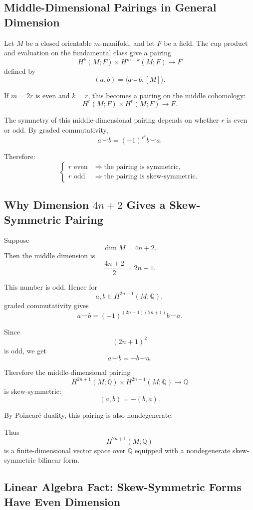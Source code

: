 \documentclass[12pt,a4paper]{article}
\theoremstyle{notespace}
\begin{document}
\subsection{Middle-Dimensional Pairings in General Dimension}

Let \(M\) be a closed orientable \(m\)-manifold, and let \(F\) be a field. The cup
product and evaluation on the fundamental class give a pairing
\[
H^k(M;F)\times H^{m-k}(M;F)\longrightarrow F
\]
defined by
\[
(a,b)=\langle a\smile b,[M]\rangle.
\]

If \(m=2r\) is even and \(k=r\), this becomes a pairing on the middle cohomology:
\[
H^r(M;F)\times H^r(M;F)\longrightarrow F.
\]

The symmetry of this middle-dimensional pairing depends on whether \(r\) is even
or odd. By graded commutativity,
\[
a\smile b=(-1)^{r^2}b\smile a.
\]

Therefore:
\[
\begin{cases}
	r \text{ even} & \Longrightarrow \text{the pairing is symmetric},\\
	r \text{ odd} & \Longrightarrow \text{the pairing is skew-symmetric}.
\end{cases}
\]

\subsection{Why Dimension \(4n+2\) Gives a Skew-Symmetric Pairing}

Suppose
\[
\dim M=4n+2.
\]
Then the middle dimension is
\[
\frac{4n+2}{2}=2n+1.
\]

This number is odd. Hence for
\[
a,b\in H^{2n+1}(M;\mathbb Q),
\]
graded commutativity gives
\[
a\smile b
=
(-1)^{(2n+1)(2n+1)}b\smile a.
\]

Since
\[
(2n+1)^2
\]
is odd, we get
\[
a\smile b=-b\smile a.
\]

Therefore the middle-dimensional pairing
\[
H^{2n+1}(M;\mathbb Q)\times H^{2n+1}(M;\mathbb Q)
\longrightarrow \mathbb Q
\]
is skew-symmetric:
\[
(a,b)=-(b,a).
\]

By Poincaré duality, this pairing is also nondegenerate.

Thus
\[
H^{2n+1}(M;\mathbb Q)
\]
is a finite-dimensional vector space over \(\mathbb Q\) equipped with a
nondegenerate skew-symmetric bilinear form.

\subsection{Linear Algebra Fact: Skew-Symmetric Forms Have Even Dimension}
\end{document}
